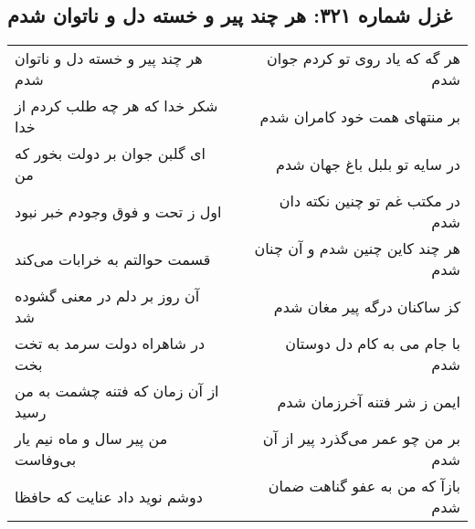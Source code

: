 \begin{center}
\section*{غزل شماره ۳۲۱: هر چند پیر و خسته دل و ناتوان شدم}
\label{sec:sh321}
\begin{longtable}{l p{0.5cm} r}
هر چند پیر و خسته دل و ناتوان شدم
&&
هر گه که یاد روی تو کردم جوان شدم
\\
شکر خدا که هر چه طلب کردم از خدا
&&
بر منتهای همت خود کامران شدم
\\
ای گلبن جوان بر دولت بخور که من
&&
در سایه تو بلبل باغ جهان شدم
\\
اول ز تحت و فوق وجودم خبر نبود
&&
در مکتب غم تو چنین نکته دان شدم
\\
قسمت حوالتم به خرابات می‌کند
&&
هر چند کاین چنین شدم و آن چنان شدم
\\
آن روز بر دلم در معنی گشوده شد
&&
کز ساکنان درگه پیر مغان شدم
\\
در شاهراه دولت سرمد به تخت بخت
&&
با جام می به کام دل دوستان شدم
\\
از آن زمان که فتنه چشمت به من رسید
&&
ایمن ز شر فتنه آخرزمان شدم
\\
من پیر سال و ماه نیم یار بی‌وفاست
&&
بر من چو عمر می‌گذرد پیر از آن شدم
\\
دوشم نوید داد عنایت که حافظا
&&
بازآ که من به عفو گناهت ضمان شدم
\\
\end{longtable}
\end{center}
